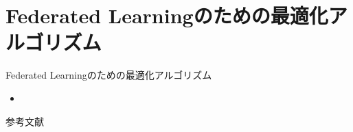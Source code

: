 \documentclass[dvipdfmx,notheorems,t]{beamer}
\begin{document}
\section{Federated Learningのための最適化アルゴリズム}

\begin{frame}{Federated Learningのための最適化アルゴリズム}

\begin{itemize}
	\item 
\end{itemize}

\end{frame}

\begin{frame}{参考文献}




\end{frame}
\end{document}
